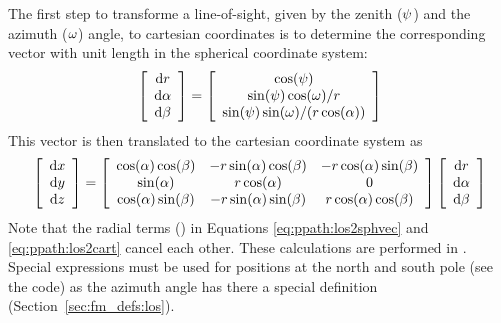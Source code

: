 The first step to transforme a line-of-sight, given by the zenith
($\psi$) and the azimuth ($\omega$) angle, to cartesian
coordinates is to determine the corresponding vector with unit length
in the spherical coordinate system:
\begin{equation}
 \left[ \begin{array}{c}
  \mathrm{d} r \\
  \mathrm{d} \alpha \\
  \mathrm{d} \beta
 \end{array} \right] =
 \left[ \begin{array}{c}
   \cos(\psi) \\
   \sin(\psi) \cos(\omega) / r \\
   \sin(\psi) \sin(\omega) / ( r \cos(\alpha) )
 \end{array} \right]
 \label{eq:ppath:los2sphvec}
\end{equation}
This vector is then translated to the cartesian coordinate system as
\begin{equation}
 \left[ \begin{array}{c}
  \mathrm{d} x \\
  \mathrm{d} y \\
  \mathrm{d} z
 \end{array} \right] =
 \left[ \begin{array}{ccc}
  \cos(\alpha)\cos(\beta) & -r\sin(\alpha)\cos(\beta) & 
                                                   -r\cos(\alpha)\sin(\beta) \\
  \sin(\alpha)           & r\cos(\alpha)            & 0                     \\ 
  \cos(\alpha)\sin(\beta) & -r\sin(\alpha)\sin(\beta) & r\cos(\alpha)\cos(\beta) 
 \end{array} \right] 
 \left[ \begin{array}{c}
  \mathrm{d} r \\
  \mathrm{d} \alpha \\
  \mathrm{d} \beta
 \end{array} \right]
 \label{eq:ppath:los2cart}
\end{equation}
Note that the radial terms (\Rds) in Equations
\ref{eq:ppath:los2sphvec} and \ref{eq:ppath:los2cart} cancel each
other.  These calculations are performed in .
Special expressions must be used for positions at the north and south
pole (see the code) as the azimuth angle has there a special
definition (Section~\ref{sec:fm_defs:los}).

